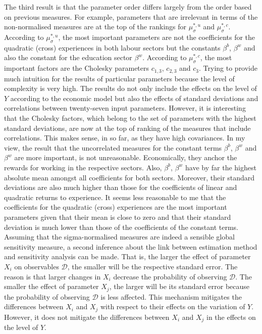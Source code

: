 The third result is that the parameter order differs largely from the order based on previous measures.
For example, parameters that are irrelevant in terms of the non-normalised measures are at the top of the rankings for $\mu^{*,u}_{\sigma}$ and $\mu^{*,c}_{\sigma}$. According to $\mu^{*,u}_{\sigma}$, the most important parameters are not the coefficients for the quadratic (cross) experiences in both labour sectors but the constants $\beta^b$, $\beta^w$ and also the constant for the education sector $\beta^w$. According to $\mu^{*,c}_{\sigma}$, the most important factors are the Cholesky parameters $c_{1,3}$, $c_{2,3}$ and $c_{3}$. Trying to provide much intuition for the results of particular parameters because the level of complexity is very high. The results do not only include the effects on the level of $Y$ according to the economic model but also the effects of standard deviations and correlations between twenty-seven input parameters. However, it is interesting that the Cholesky factors, which belong to the set of parameters with the highest standard deviations, are now at the top of ranking of the measures that include correlations. This makes sense, in so far, as they have high covariances. In my view, the result that the uncorrelated measures for the constant terms $\beta^b$, $\beta^w$ and $\beta^w$ are more important, is not unreasonable. Economically, they anchor the rewards for working in the respective sectors. Also, $\beta^b$, $\beta^w$ have by far the highest absolute mean amongst all coefficients for both sectors. Moreover, their standard deviations are also much higher than those for the coefficients of linear and quadratic returns to experience. It seems less reasonable to me that the coefficients for the quadratic (cross) experiences are the most important parameters given that their mean is close to zero and that their standard deviation is much lower than those of the coefficients of the constant terms.\\

\noindent
Assuming that the sigma-normalised measures are indeed a sensible global sensitivity measure, a second inference about the link between estimation method and sensitivity analysis can be made. That is, the larger the effect of parameter $X_i$ on observables $\pmb{\mathcal{D}}$, the smaller will be the respective standard error. The reason is that larger changes in $X_i$ decrease the probability of observing $\pmb{\mathcal{D}}$. The smaller the effect of parameter $X_j$, the larger will be its standard error because the probability of observing $\pmb{\mathcal{D}}$ is less affected. This mechanism mitigates the differences between $X_i$ and $X_j$ with respect to their effects on the variation of $Y$. However, it does not mitigate the differences between $X_i$ and $X_j$ in the effects on the level of $Y$.\\


